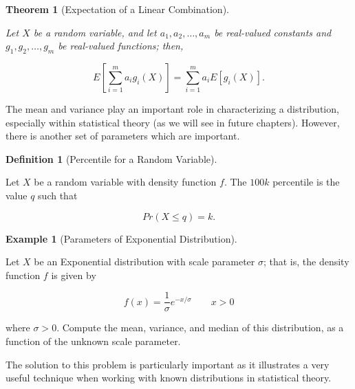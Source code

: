 \documentclass[
  letterpaper,
  DIV=11,
  numbers=noendperiod]{scrreprt}
\theoremstyle{definition}
\newtheorem{example}{Example}[chapter]
\theoremstyle{definition}
\newtheorem{definition}{Definition}[chapter]
\theoremstyle{plain}
\newtheorem{theorem}{Theorem}[chapter]
\theoremstyle{remark}
\begin{document}
\begin{theorem}[Expectation of a Linear
Combination]\protect\hypertarget{thm-expectation}{}\label{thm-expectation}

Let \(X\) be a random variable, and let \(a_1, a_2, \dotsc, a_m\) be
real-valued constants and \(g_1, g_2, \dotsc, g_m\) be real-valued
functions; then,

\[E\left[\sum_{i=1}^{m} a_i g_i(X)\right] = \sum_{i=1}^{m} a_i E\left[g_i(X)\right].\]

\end{theorem}

The mean and variance play an important role in characterizing a
distribution, especially within statistical theory (as we will see in
future chapters). However, there is another set of parameters which are
important.

\begin{definition}[Percentile for a Random
Variable]\protect\hypertarget{def-population-percentile}{}\label{def-population-percentile}

Let \(X\) be a random variable with density function \(f\). The \(100k\)
percentile is the value \(q\) such that

\[Pr(X \leq q) = k.\]

\end{definition}

\begin{example}[Parameters of Exponential
Distribution]\protect\hypertarget{exm-parameters}{}\label{exm-parameters}

Let \(X\) be an Exponential distribution with scale parameter
\(\sigma\); that is, the density function \(f\) is given by

\[f(x) = \frac{1}{\sigma} e^{-x/\sigma} \qquad x > 0\]

where \(\sigma > 0.\) Compute the mean, variance, and median of this
distribution, as a function of the unknown scale parameter.

\end{example}

The solution to this problem is particularly important as it illustrates
a very useful technique when working with known distributions in
statistical theory.
\end{document}
